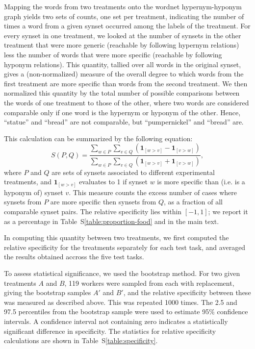 \documentclass[12pt]{article}
\begin{document}
Mapping the words from two treatments onto the wordnet 
hypernym-hyponym graph yields two sets of counts, one set per treatment, 
indicating the number of times a word from a given synset occurred among the
labels of the treatment.  For every synset in one treatment, we looked
at the number of synsets in the other treatment that were more generic
(reachable by following hypernym relations) less the number of words that
were more specific (reachable by following hyponym relations).  This quantity,
tallied over all words in the original synset, gives a (non-normalized) 
measure of the overall degree to which words from the first treatment are more
specific than words from the second treatment.  We then normalized this 
quantity by the total number of possible comparisons between the words of
one treatment to those of the other, where two words are considered comparable
only if one word is the hypernym or hyponym of the other.  Hence, ``statue'' 
and ``bread'' are not comparable, but ``pumpernickel'' and ``bread'' are.

This calculation can be summarized by the following equation:
\begin{equation}
	S(P,Q) = \frac{
		\sum_{w\in P}\sum_{v\in Q} \left(
			\mathbf{1}_{[w>v]} - \mathbf{1}_{[v>w]} \right)
	}{
		\sum_{w\in P}\sum_{v\in Q} \left(
			\mathbf{1}_{[w>v]} + \mathbf{1}_{[v>w]} \right)
	},
\end{equation}
where $P$ and $Q$ are sets of synsets associated to different experimental 
treatments, and $\mathbf{1}_{[w>v]}$ evaluates
to 1 if synset $w$ is more specific than (i.e. is a hyponym of) synset $v$.
This measure counts the excess number of cases where synsets from $P$ are more
specific then synsets from $Q$, as a fraction of all comparable synset pairs. 
The relative specificity lies within $[-1,1]$; we report it as a percentage 
in Table~S\ref{table:proportion-food} and in the main text.

In computing this quantity between two treatments, we first computed the 
relative specificity for the treatments separately for each test task, and 
averaged the results obtained accross the five test tasks.

To assess statistical significance, we used the bootstrap method.
For two given treatments $A$ and $B$, 
119 workers were sampled from each with replacement, giving the bootstrap
samples $A'$ and $B'$, and the relative specificity between these 
was measured as described above.
This was repeated 1000 times.  The 2.5 and 97.5 percentiles from the 
bootstrap sample were used to estimate 95\% confidence intervals.  
A confidence interval not containing zero indicates a statistically 
significant difference in specificity.  
The statistics for relative specificity 
calculations are shown in Table~S\ref{table:specificity}.
\end{document}

